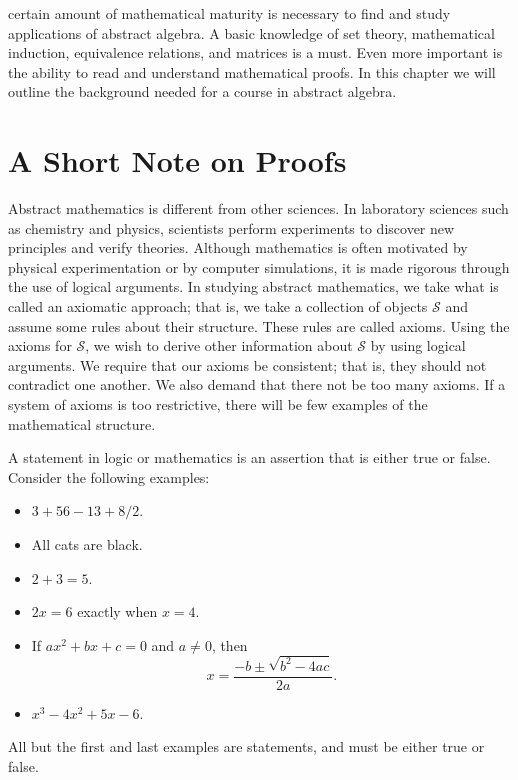 
 
certain amount of mathematical maturity is necessary to find and study applications of abstract algebra.  A basic knowledge of set theory, mathematical induction, equivalence relations, and matrices is a must.  Even more important is the ability to read and understand mathematical proofs.  In this chapter we will outline the background needed for a course in abstract algebra.
 

\section{A Short Note on Proofs}\label{sets_short_note}
 
Abstract mathematics is different from other sciences. In laboratory sciences such as chemistry and physics, scientists perform experiments to discover new principles and verify theories.  Although mathematics is often motivated by physical experimentation or by computer simulations, it is made rigorous through the use of logical arguments.  In studying abstract mathematics, we take what is called an  axiomatic approach; that is, we take a collection of objects $\mathcal S$ and assume some rules about their structure.  These rules are called {\bfi axioms}.  Using the axioms for $\mathcal S$, we wish to derive other information about $\mathcal S$ by using logical arguments.  We require that our axioms be consistent; that is, they should not contradict one another.  We also demand that there not be too many axioms.  If a system of axioms is too restrictive,  there will be few examples of the mathematical structure.  

A {\bfi statement\/} in logic or mathematics is an assertion that is either true or false.  Consider the following examples:
\begin{itemize}
 
\item
$3 + 56 - 13 + 8/2 $.
 
\item
All cats are black.
 
\item
$2 + 3 = 5$.
 
\item
$2x = 6$ exactly when $x = 4$.
 
\item
If $ax^2 + bx + c = 0$ and $a \neq 0$, then
\[
x = \frac{-b \pm \sqrt{b^2 - 4ac}}{2a}.
\]
 
\item
$x^3 - 4x^2 + 5 x - 6$.
 
\end{itemize}
All but the first  and last examples are statements, and must be either true or false.  
 
